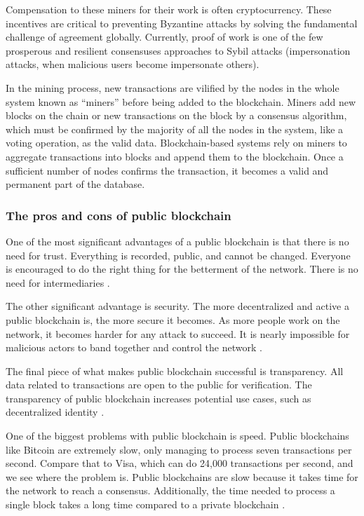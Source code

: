 Compensation to these miners for their work is often cryptocurrency. These incentives are critical to preventing Byzantine attacks by solving the fundamental challenge of agreement globally. Currently, proof of work is one of the few prosperous and resilient consensuses approaches to Sybil attacks \cite{douceur2002sybil} (impersonation attacks, when malicious users become impersonate others).

In the mining process, new transactions are vilified by the nodes in the whole system known as “miners” before being added to the blockchain. Miners add new blocks on the chain or new transactions on the block by a consensus algorithm, which must be confirmed by the majority of all the nodes in the system, like a voting operation, as the valid data. Blockchain-based systems rely on miners to aggregate transactions into blocks and append them to the blockchain. Once a sufficient number of nodes confirms the transaction, it becomes a valid and permanent part of the database. 

\subsubsection{The pros and cons of public blockchain}\label{sec:prosConsPub}

One of the most significant advantages of a public blockchain is that there is no need for trust. Everything is recorded, public, and cannot be changed. Everyone is encouraged to do the right thing for the betterment of the network. There is no need for intermediaries \cite{blockgeeks2018deeper}.

The other significant advantage is security. The more decentralized and active a public blockchain is, the more secure it becomes. As more people work on the network, it becomes harder for any attack to succeed. It is nearly impossible for malicious actors to band together and control the network \cite{selfkeyOrg}.

The final piece of what makes public blockchain successful is transparency. All data related to transactions are open to the public for verification. The transparency of public blockchain increases potential use cases, such as decentralized identity \cite{Comstor2018}.

One of the biggest problems with public blockchain is speed. Public blockchains like Bitcoin are extremely slow, only managing to process seven transactions per second. Compare that to Visa, which can do 24,000 transactions per second, and we see where the problem is. Public blockchains are slow because it takes time for the network to reach a consensus. Additionally, the time needed to process a single block takes a long time compared to a private blockchain \cite{blockgeeks2018deeper}.

